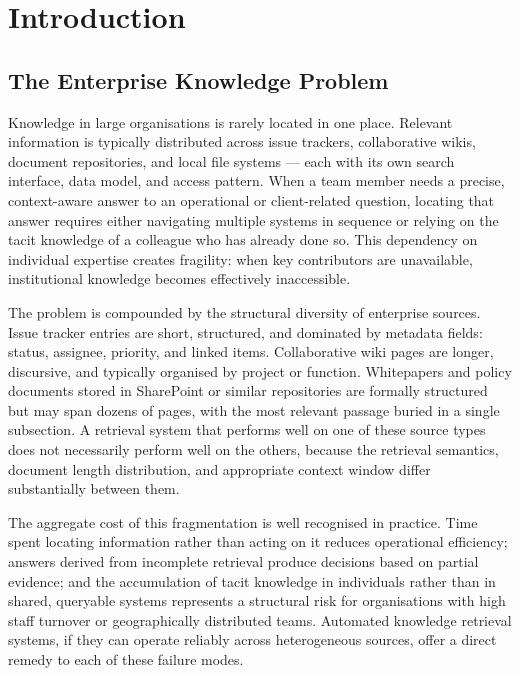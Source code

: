 
\chapter{Introduction}
\label{ch:introduction}

\section{The Enterprise Knowledge Problem}

Knowledge in large organisations is rarely located in one place. Relevant information is typically distributed across issue trackers, collaborative wikis, document repositories, and local file systems — each with its own search interface, data model, and access pattern. When a team member needs a precise, context-aware answer to an operational or client-related question, locating that answer requires either navigating multiple systems in sequence or relying on the tacit knowledge of a colleague who has already done so. This dependency on individual expertise creates fragility: when key contributors are unavailable, institutional knowledge becomes effectively inaccessible.

The problem is compounded by the structural diversity of enterprise sources. Issue tracker entries are short, structured, and dominated by metadata fields: status, assignee, priority, and linked items. Collaborative wiki pages are longer, discursive, and typically organised by project or function. Whitepapers and policy documents stored in SharePoint or similar repositories are formally structured but may span dozens of pages, with the most relevant passage buried in a single subsection. A retrieval system that performs well on one of these source types does not necessarily perform well on the others, because the retrieval semantics, document length distribution, and appropriate context window differ substantially between them.

The aggregate cost of this fragmentation is well recognised in practice. Time spent locating information rather than acting on it reduces operational efficiency; answers derived from incomplete retrieval produce decisions based on partial evidence; and the accumulation of tacit knowledge in individuals rather than in shared, queryable systems represents a structural risk for organisations with high staff turnover or geographically distributed teams. Automated knowledge retrieval systems, if they can operate reliably across heterogeneous sources, offer a direct remedy to each of these failure modes.


